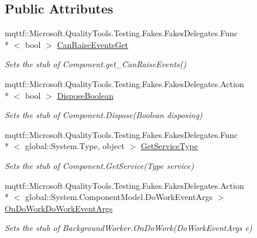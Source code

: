 \subsection*{Public Attributes}
\begin{DoxyCompactItemize}
\item 
mqttf\-::\-Microsoft.\-Quality\-Tools.\-Testing.\-Fakes.\-Fakes\-Delegates.\-Func\\*
$<$ bool $>$ \hyperlink{class_system_1_1_component_model_1_1_fakes_1_1_stub_background_worker_a1cd0c0123eb997090616e39ad8614edf}{Can\-Raise\-Events\-Get}
\begin{DoxyCompactList}\small\item\em Sets the stub of Component.\-get\-\_\-\-Can\-Raise\-Events()\end{DoxyCompactList}\item 
mqttf\-::\-Microsoft.\-Quality\-Tools.\-Testing.\-Fakes.\-Fakes\-Delegates.\-Action\\*
$<$ bool $>$ \hyperlink{class_system_1_1_component_model_1_1_fakes_1_1_stub_background_worker_ac78da2f5c0a6e1ed8d0dfaeaa16390bb}{Dispose\-Boolean}
\begin{DoxyCompactList}\small\item\em Sets the stub of Component.\-Dispose(\-Boolean disposing)\end{DoxyCompactList}\item 
mqttf\-::\-Microsoft.\-Quality\-Tools.\-Testing.\-Fakes.\-Fakes\-Delegates.\-Func\\*
$<$ global\-::\-System.\-Type, object $>$ \hyperlink{class_system_1_1_component_model_1_1_fakes_1_1_stub_background_worker_a03300c01652e26154c96c52b348b91dd}{Get\-Service\-Type}
\begin{DoxyCompactList}\small\item\em Sets the stub of Component.\-Get\-Service(\-Type service)\end{DoxyCompactList}\item 
mqttf\-::\-Microsoft.\-Quality\-Tools.\-Testing.\-Fakes.\-Fakes\-Delegates.\-Action\\*
$<$ global\-::\-System.\-Component\-Model.\-Do\-Work\-Event\-Args $>$ \hyperlink{class_system_1_1_component_model_1_1_fakes_1_1_stub_background_worker_a3a49242350f4567e881daced877bb6cd}{On\-Do\-Work\-Do\-Work\-Event\-Args}
\begin{DoxyCompactList}\small\item\em Sets the stub of Background\-Worker.\-On\-Do\-Work(\-Do\-Work\-Event\-Args e)\end{DoxyCompactList}\item 

\end{DoxyCompactItemize}
